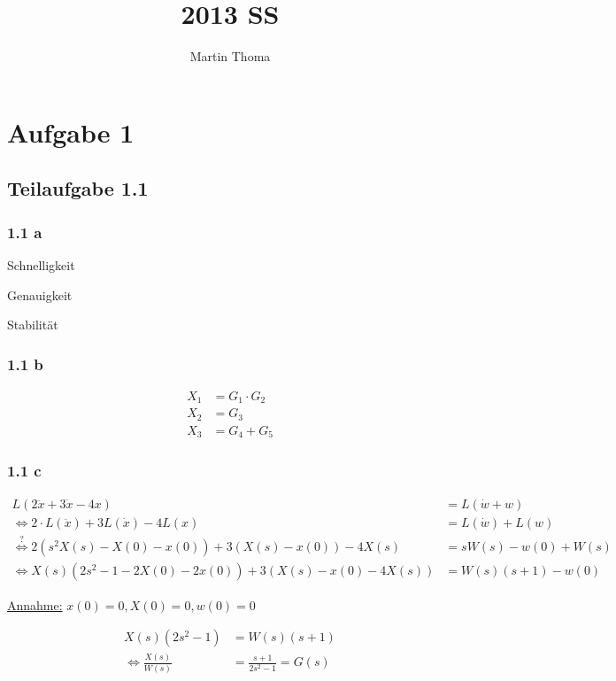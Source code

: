 \documentclass[a4paper]{scrartcl}
\begin{document}
 \title{2013 SS}
 \author{Martin Thoma}

 \setcounter{section}{1}
 \section*{Aufgabe 1}
 \subsection*{Teilaufgabe 1.1}
 \subsubsection*{1.1 a}
  \begin{enumerate*}[label=(\arabic*)]
      \item Schnelligkeit
      \item Genauigkeit
      \item Stabilität
  \end{enumerate*}

  \subsubsection*{1.1 b}
  \begin{align}
      X_1 &= G_1 \cdot G_2\\
      X_2 &= G_3\\
      X_3 &= G_4 + G_5
  \end{align}

  \subsubsection*{1.1 c}
  \begin{align}
      L(2 \ddot{x} + 3 \dot{x} - 4x) &= L(\dot{w} + w)\\
      \Leftrightarrow 2 \cdot L(\ddot{x}) + 3 L(\dot{x}) - 4 L(x) &= L(\dot{w}) + L(w)\\
      \overset{?}{\Leftrightarrow} 2 (s^2 X(s) - X(0) - x(0)) + 3(X(s) - x(0)) - 4 X(s) &= s W(s) - w(0) + W(s)\\
      \Leftrightarrow X(s) (2s^2 - 1 - 2 X(0) - 2x(0)) + 3(X(s) - x(0) - 4 X(s)) &= W(s)(s+1) - w(0)
  \end{align}

  \underline{Annahme:} $x(0) = 0, X(0) = 0, w(0) = 0$ 

  \begin{align}
      X(s) (2s^2 - 1) &= W(s) (s+1)\\
      \Leftrightarrow \frac{X(s)}{W(s)} &= \frac{s+1}{2s^2 - 1} = G(s)
  \end{align}
\end{document}
